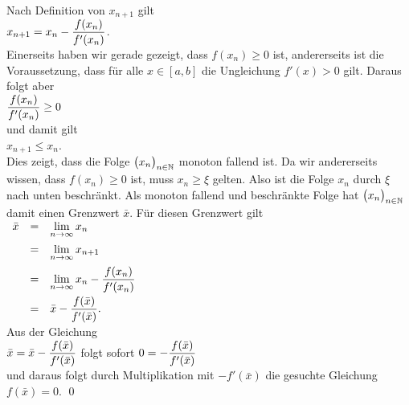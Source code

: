 Nach Definition von $x_{n+1}$ gilt
\\[0.2cm]
\hspace*{1.3cm}
$\displaystyle x_{n+1} = x_n - \frac{f(x_n)}{f'(x_n)}$.
\\[0.2cm]
Einerseits haben wir gerade gezeigt, dass $f(x_n) \geq 0$ ist, andererseits ist die Voraussetzung, dass
f\"ur alle $x \in [a,b]$ die Ungleichung $f'(x) > 0$ gilt.  Daraus folgt aber
\\[0.2cm]
\hspace*{1.3cm}
$\displaystyle\frac{f(x_n)}{f'(x_n)} \geq 0$
\\[0.2cm]
und damit gilt
\\[0.2cm]
\hspace*{1.3cm}
$x_{n+1} \leq x_n$.
\\[0.2cm]
Dies zeigt, dass die Folge $\bigl(x_n\bigr)_{n\in\mathbb{N}}$ monoton fallend ist.  Da wir andererseits wissen, dass
$f(x_n) \geq 0$ ist, muss $x_n \geq \xi$ gelten.  Also ist die Folge $x_n$ durch $\xi$ nach unten beschr\"ankt.
Als monoton fallend und beschr\"ankte Folge hat $\bigl(x_n\bigr)_{n\in\mathbb{N}}$ damit einen Grenzwert $\bar{x}$.  
F\"ur diesen Grenzwert gilt 
\\[0.2cm]
\hspace*{1.3cm}
$
\begin{array}{lcl}
  \bar{x} & = & \displaystyle\lim\limits_{n\rightarrow\infty} x_n                             \\[0.3cm]
          & = & \displaystyle\lim\limits_{n\rightarrow\infty} x_{n+1}                         \\[0.3cm]
          & = & \displaystyle\lim\limits_{n\rightarrow\infty} x_{n} - \frac{f(x_n)}{f'(x_n)} \\[0.3cm]
          & = & \displaystyle\bar{x} - \frac{f(\bar{x})}{f'(\bar{x})}. 
\end{array}
$
\\[0.2cm]
Aus der Gleichung
\\[0.2cm]
\hspace*{1.3cm}
$\displaystyle \bar{x} = \bar{x} - \frac{f(\bar{x})}{f'(\bar{x})}$ \quad folgt sofort \quad $\displaystyle 0 = - \frac{f(\bar{x})}{f'(\bar{x})}$
\\[0.2cm]
und daraus folgt durch Multiplikation mit $-f'(\bar{x})$ die gesuchte Gleichung $f(\bar{x}) = 0$.  \qed

